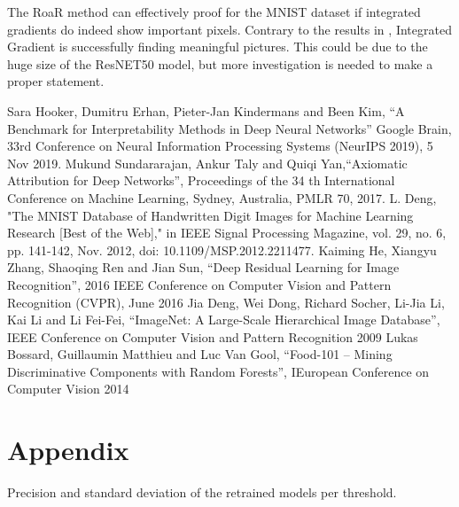 \documentclass[conference]{IEEEtran}
\begin{document}
The RoaR method can effectively proof for the MNIST dataset if integrated gradients do indeed show important pixels. Contrary to the results in \cite{RoaR}, Integrated Gradient is successfully finding meaningful pictures. This could be due to the huge size of the ResNET50 model, but more investigation is needed to make a proper statement.


\begin{thebibliography}{00}
 Sara Hooker, Dumitru Erhan, Pieter-Jan Kindermans and Been Kim, ``A Benchmark for Interpretability Methods in Deep Neural Networks'' Google Brain, 33rd Conference on Neural Information Processing Systems (NeurIPS 2019), 5 Nov 2019.
 Mukund Sundararajan, Ankur Taly and Quiqi Yan,``Axiomatic Attribution for Deep Networks'', Proceedings of the 34 th International Conference on Machine Learning, Sydney, Australia, PMLR 70, 2017. 
 L. Deng, "The MNIST Database of Handwritten Digit Images for Machine Learning Research [Best of the Web]," in IEEE Signal Processing Magazine, vol. 29, no. 6, pp. 141-142, Nov. 2012, doi: 10.1109/MSP.2012.2211477.
 Kaiming He, Xiangyu Zhang, Shaoqing Ren and  Jian Sun, ``Deep Residual Learning for Image Recognition'', 2016 IEEE Conference on Computer Vision and Pattern Recognition (CVPR), June 2016 
 Jia Deng, Wei Dong, Richard Socher, Li-Jia Li, Kai Li and Li Fei-Fei, ``ImageNet: A Large-Scale Hierarchical Image Database'', IEEE Conference on Computer Vision and Pattern Recognition 2009
 Lukas Bossard, Guillaumin Matthieu and Luc Van Gool, ``Food-101 -- Mining Discriminative Components with Random Forests'', IEuropean Conference on Computer Vision 2014
\end{thebibliography}
\onecolumn
\newpage



\section{Appendix}
\centering
Precision and standard deviation of the retrained models per threshold.
\end{document}
